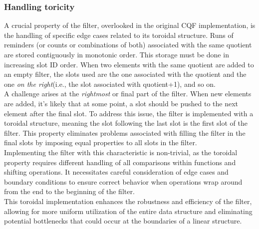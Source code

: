 \subsubsection{Handling toricity}
A crucial property of the filter, overlooked in the original CQF implementation, is the handling of specific edge cases related to its toroidal structure. Runs of reminders (or counts or combinations of both) associated with the same quotient are stored contiguously in monotonic order. This storage must be done in increasing slot ID order. When two elements with the same quotient are added to an empty filter, the slots used are the one associated with the quotient and the one \emph{on the right}(i.e., the slot associated with quotient+1), and so on.\\
A challenge arises at the \emph{rightmost} or final part of the filter. When new elements are added, it's likely that at some point, a slot should be pushed to the next element after the final slot. To address this issue, the filter is implemented with a toroidal structure, meaning the slot following the last slot is the first slot of the filter. This property eliminates problems associated with filling the filter in the final slots by imposing equal properties to all slots in the filter.\\
Implementing the filter with this characteristic is non-trivial, as the toroidal property requires different handling of all comparisons within functions and shifting operations. It necessitates careful consideration of edge cases and boundary conditions to ensure correct behavior when operations wrap around from the end to the beginning of the filter.\\
This toroidal implementation enhances the robustness and efficiency of the filter, allowing for more uniform utilization of the entire data structure and eliminating potential bottlenecks that could occur at the boundaries of a linear structure.

